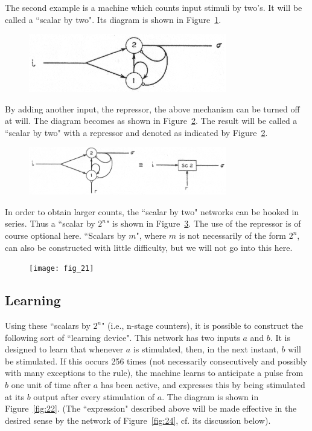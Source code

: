 \documentclass[twocolumn,preprintnumbers,amsmath,amssymb,floatfix]{revtex4}
\begin{document}
The second example is a machine which counts input stimuli by
two's. It will be called a ``scalar by two". Its diagram is shown
in Figure~\ref{fig:19}.

\begin{figure}[b]
\includegraphics[width=3.4in]{fig_19}
\caption{\label{fig:19}}
\end{figure}

By adding another input, the repressor, the above mechanism can be
turned off at will. The diagram becomes as shown in
Figure~\ref{fig:20}. The result will be called a ``scalar by two"
with a repressor and denoted as indicated by  Figure~\ref{fig:20}.

\begin{figure}[b]
\includegraphics[width=3.4in]{fig_20}
\caption{\label{fig:20}}
\end{figure}

In order to obtain larger counts, the ``scalar by two" networks
can be hooked in series. Thus a ``scalar by $2^n$" is shown in
Figure~\ref{fig:21}. The use of the repressor is of course
optional here. ``Scalars by $m$", where $m$ is not necessarily of
the form $2^n$, can also be constructed with little difficulty,
but we will not go into this here.

\begin{figure}[t]
\texttt{[image: fig\_21]}
\caption{\label{fig:21}}
\end{figure}

\subsection{\label{sec:six3}Learning}

Using these ``scalars by $2^n$" (i.e., n-stage counters), it is
possible to construct the following sort of ``learning device".
This network has two inputs $a$ and $b$. It is designed to learn
that whenever $a$ is stimulated, then, in the next instant, $b$
will be stimulated. If this occurs 256 times (not necessarily
consecutively and possibly with many exceptions to the rule), the
machine learns to anticipate a pulse from $b$ one unit of time
after $a$ has been active, and expresses this by being stimulated
at its $b$ output after every stimulation of $a$. The diagram is
shown in Figure~\ref{fig:22}. (The ``expression" described above
will be made effective in the desired sense by the network of
Figure~\ref{fig:24}, cf. its discussion below).
\end{document}
